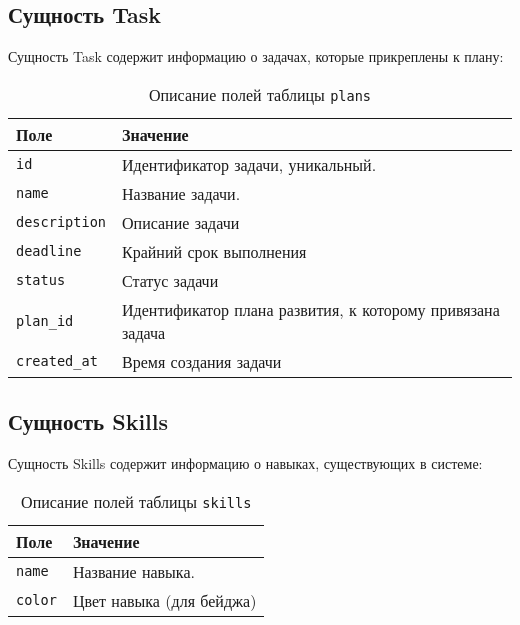 \subsection{Сущность Task}
Сущность Task содержит информацию о задачах, которые прикреплены к плану:
\begin{table}[!ht]
    \caption{Описание полей таблицы \texttt{plans}}
    \label{tbl:task}
    \begin{center}
        \begin{tabular}{|p{}p{}|}
            \hline
            \textbf{Поле} & \textbf{Значение} \\\hline
            \texttt{id} & Идентификатор задачи, уникальный. \\\hline
            \texttt{name} & Название задачи. \\\hline
            \texttt{description} & Описание задачи \\\hline
            \texttt{deadline} & Крайний срок выполнения \\\hline
            \texttt{status} & Статус задачи \\\hline
            \texttt{plan\_id} & Идентификатор плана развития, к которому привязана задача \\\hline
            \texttt{created\_at} & Время создания задачи\\\hline
        \end{tabular}
    \end{center}
\end{table}
\newpage

\subsection{Сущность Skills}
Сущность Skills содержит информацию о навыках, существующих в системе:
\begin{table}[!ht]
    \caption{Описание полей таблицы \texttt{skills}}
    \label{tbl:skills}
    \begin{center}
        \begin{tabular}{|p{}p{}|}
            \hline
            \textbf{Поле} & \textbf{Значение} \\\hline
            \texttt{name} & Название навыка. \\\hline
            \texttt{color} & Цвет навыка (для бейджа) \\\hline
        \end{tabular}
    \end{center}
\end{table}
